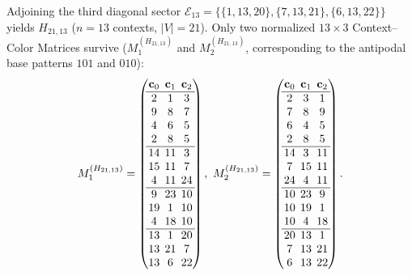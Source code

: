 \documentclass[aps,pra,reprint,superscriptaddress,longbibliography,nofootinbib,floatfix,10pt]{revtex4-2}
\theoremstyle{definition}\newtheorem{definition}[theorem]{Definition}
\theoremstyle{remark}\newtheorem{remark}[theorem]{Remark}
\begin{document}
Adjoining the third diagonal sector $\mathcal{E}_{13}=\{\{1,13,20\},\{7,13,21\},\{6,13,22\}\}$ yields $H_{21,13}$ ($n=13$ contexts, $|V|=21$). Only two normalized $13\times 3$ Context--Color Matrices survive ($M_1^{(H_{21,13})}$ and $M_2^{(H_{21,13})}$, corresponding to the antipodal base patterns $101$ and $010$):
\begin{equation}\label{eq:H21-matrices}
\setlength{\arraycolsep}{2.2pt}
M_1^{(H_{21,13})}=\begin{pmatrix}
\mathbf{c}_0&\mathbf{c}_1&\mathbf{c}_2\\\hline
2&1&3\\
9&8&7\\
4&6&5\\
2&8&5\\\hline
14&11&3\\
15&11&7\\
4&11&24\\\hline
9&23&10\\
19&1&10\\
4&18&10\\\hline
13&1&20\\
13&21&7\\
13&6&22
\end{pmatrix},\ 
M_2^{(H_{21,13})}=\begin{pmatrix}
\mathbf{c}_0&\mathbf{c}_1&\mathbf{c}_2\\\hline
2&3&1\\
7&8&9\\
6&4&5\\
2&8&5\\\hline
14&3&11\\
7&15&11\\
24&4&11\\\hline
10&23&9\\
10&19&1\\
10&4&18\\\hline
20&13&1\\
7&13&21\\
6&13&22
\end{pmatrix}.
\end{equation}
\end{document}
